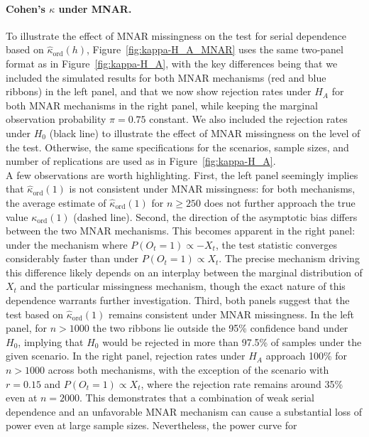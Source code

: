 ﻿\documentclass[12pt,a4paper]{scrreprt}
\theoremstyle{definition}
\begin{document}
\paragraph{Cohen's $\kappa$ under MNAR.}
To illustrate the effect of MNAR missingness on the test for serial dependence based on
$\hat{\kappa}_{\mathrm{ord}}(h)$, Figure~\ref{fig:kappa-H_A_MNAR} uses the same two-panel
format as in Figure~\ref{fig:kappa-H_A}, with the key differences being that we included
the simulated results for both MNAR mechanisms (red and blue ribbons) in the left panel,
and that we now show rejection rates under $H_A$ for both MNAR mechanisms in the right
panel, while keeping the marginal observation probability $\pi = 0.75$ constant. We also
included the rejection rates under $H_0$ (black line) to illustrate the effect of MNAR
missingness on the level of the test. Otherwise, the same specifications for the scenarios,
sample sizes, and number of replications are used as in Figure~\ref{fig:kappa-H_A}. \\
A few observations are worth highlighting. First, the left panel seemingly implies that
$\hat{\kappa}_{\mathrm{ord}}(1)$ is not consistent under MNAR missingness: for both
mechanisms, the average estimate of $\hat{\kappa}_{\mathrm{ord}}(1)$ for $n \geq 250$
does not further approach the true value $\kappa_{\mathrm{ord}}(1)$ (dashed line).
Second, the direction of the asymptotic bias differs between the two MNAR mechanisms.
This becomes apparent in the right panel: under the mechanism where
$P(O_t = 1) \propto -X_t$, the test statistic converges considerably faster than under
$P(O_t = 1) \propto X_t$. The precise mechanism driving this difference likely depends
on an interplay between the marginal distribution of $X_t$ and the particular missingness
mechanism, though the exact nature of this dependence warrants further investigation.
Third, both panels suggest that the test based on $\hat{\kappa}_{\mathrm{ord}}(1)$
remains consistent under MNAR missingness. In the left panel, for $n > 1000$ the two
ribbons lie outside the 95\% confidence band under $H_0$, implying that $H_0$ would be
rejected in more than 97.5\% of samples under the given scenario. In the right panel,
rejection rates under $H_A$ approach 100\% for $n > 1000$ across both mechanisms, with
the exception of the scenario with $r = 0.15$ and $P(O_t = 1) \propto X_t$, where the
rejection rate remains around 35\% even at $n = 2000$. This demonstrates that a
combination of weak serial dependence and an unfavorable MNAR mechanism can cause a
substantial loss of power even at large sample sizes. Nevertheless, the power curve for
\end{document}
